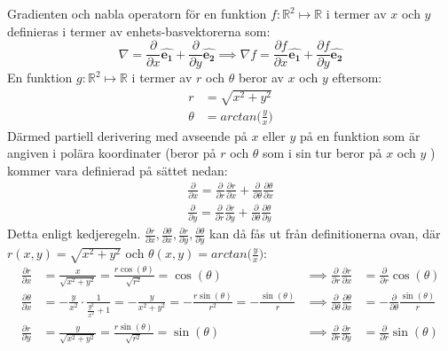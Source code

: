 \documentclass{report}
\begin{document}
{	Gradienten och nabla operatorn för en funktion $f : \mathbb{R}^2 \mapsto \mathbb{R}$ i termer av $x$ och $y$ definieras i termer av enhets-basvektorerna som:
	\begin{equation*}
		\nabla = \frac{\partial }{\partial x}\boldsymbol{\hat{e_1}}+\frac{\partial }{\partial y}\boldsymbol{\hat{e_2}} \implies \nabla f = \frac{\partial f}{\partial x}\boldsymbol{\hat{e_1}}+\frac{\partial f}{\partial y}\boldsymbol{\hat{e_2}}
	\end{equation*}
	En funktion $g : \mathbb{R}^2 \mapsto \mathbb{R}$ i termer av $r$ och $\theta$ beror av $x$ och $y$ eftersom:
	\begin{align*}
		r &= \sqrt{x^2+y^2}\\
		\theta &= arctan\bigl(\frac{y}{x}\bigr)
	\end{align*}
	Därmed partiell derivering med avseende på $x$ eller $y$ på en funktion som är angiven i polära koordinater (beror på $r$ och $\theta$ som i sin tur beror på $x$ och $y$ ) kommer vara definierad på sättet nedan:
	\begin{align*}
		\frac{\partial }{\partial x} = \frac{\partial }{\partial r} \frac{\partial r}{\partial x} + \frac{\partial }{\partial \theta} \frac{\partial \theta}{\partial x}\\
		\frac{\partial }{\partial y} = \frac{\partial }{\partial r} \frac{\partial r}{\partial y} + \frac{\partial }{\partial \theta} \frac{\partial \theta}{\partial y}
	\end{align*}
	Detta enligt kedjeregeln. $\frac{\partial r}{\partial x}, \frac{\partial \theta}{\partial x}, \frac{\partial r}{\partial y}, \frac{\partial \theta}{\partial y}$ kan då fås ut från definitionerna ovan, där $r(x,y) = \sqrt{x^2+y^2}$ och $\theta(x,y) = arctan\bigl(\frac{y}{x}\bigr)$:
	\begin{align*}
		\frac{\partial r}{\partial x} &= \frac{x}{\sqrt{x^2+y^2}} = \frac{r\cos(\theta)}{\sqrt{r^2}} = \cos(\theta) &\implies \frac{\partial }{\partial r} \frac{\partial r}{\partial x} &= \frac{\partial }{\partial r}\cos(\theta)\\
		\frac{\partial \theta}{\partial x} &= -\frac{y}{x^2} \cdot \frac{1}{\frac{y^2}{x^2}+1} = -\frac{y}{x^2+y^2} = -\frac{r\sin(\theta)}{r^2} = - \frac{\sin(\theta)}{r} &\implies \frac{\partial }{\partial \theta} \frac{\partial \theta}{\partial x} &= -\frac{\partial }{\partial \theta} \frac{\sin(\theta)}{r}\\
		\frac{\partial r}{\partial y} &= \frac{y}{\sqrt{x^2+y^2}} = \frac{r\sin(\theta)}{\sqrt{r^2}} = \sin(\theta) &\implies \frac{\partial }{\partial r} \frac{\partial r}{\partial y} &= \frac{\partial }{\partial r}\sin(\theta)\\

\end{align*}}
\end{document}

